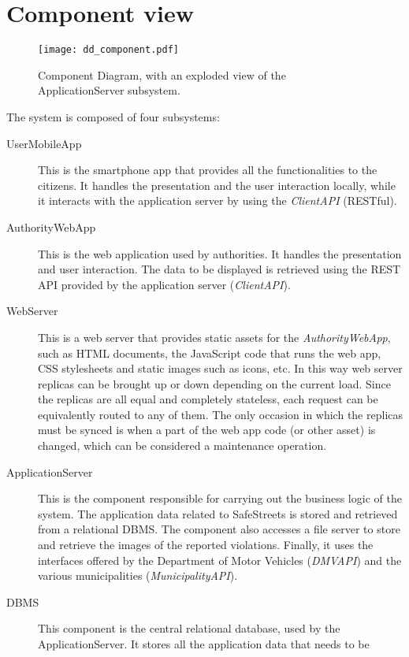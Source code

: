 \section{Component view}
\begin{figure}[t]
    \centering
    \texttt{[image: dd\_component.pdf]}
    \caption{Component Diagram, with an exploded view of the ApplicationServer
    subsystem.}
    \label{fig:component_diagram}
\end{figure}

The system is composed of four subsystems:
\begin{description}
    \item[UserMobileApp] This is the smartphone app that provides all the
    functionalities to the citizens. It handles the presentation and the user
    interaction locally, while it interacts with the application server
    by using the \emph{ClientAPI} (RESTful).
    \item[AuthorityWebApp] This is the web application used by authorities.
    It handles the presentation and user interaction. The data to be displayed
    is retrieved using the REST API provided by the application server
    (\emph{ClientAPI}).
    \item[WebServer] This is a web server that provides static assets for the
    \emph{AuthorityWebApp}, such as HTML documents, the JavaScript code that
    runs the web app, CSS stylesheets and static images such as icons, etc.
    In this way web server replicas can be brought up or down depending on the
    current load. Since the replicas are all equal and completely stateless,
    each request can be equivalently routed to any of them.
    The only occasion in which the replicas must be synced is when a part of
    the web app code (or other asset) is changed, which can be considered a
    maintenance operation.
    \item[ApplicationServer] This is the component responsible for carrying
    out the business logic of the system. The application data related to
    SafeStreets is stored and retrieved from a relational DBMS.
    The component also accesses a file server to store and retrieve the images
    of the reported violations.
    Finally, it uses the interfaces offered by the Department of Motor Vehicles
    (\emph{DMVAPI}) and the various municipalities (\emph{MunicipalityAPI}).
    \item[DBMS] This component is the central relational database, used by the
    ApplicationServer. It stores all the application data that needs to be

\end{description}
